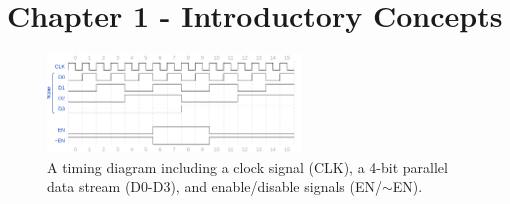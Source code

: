\documentclass[10pt]{article}
\begin{document}
\maketitle

\section{Chapter 1 - Introductory Concepts}
\begin{figure}[ht]
\centering
\includegraphics[width=0.6\textwidth]{timingExample6.pdf}
\caption{\label{fig:timing1} A timing diagram including a clock signal (CLK), a 4-bit parallel data stream (D0-D3), and enable/disable signals (EN/$\sim$EN).}
\end{figure}
\end{document}
